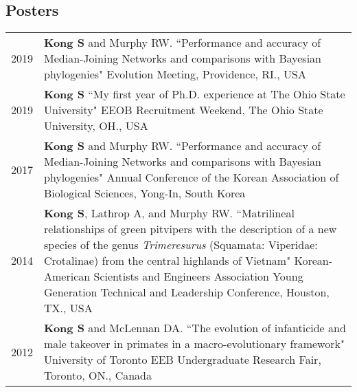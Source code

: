 \documentclass[11pt]{article}
\begin{document}
\subsection*{Posters}
\begin{longtable}{p{}  p{}}
2019 & \textbf{Kong S} and Murphy RW. ``Performance and accuracy of Median-Joining Networks and comparisons with Bayesian phylogenies" Evolution Meeting, Providence, RI., USA \vspace{5pt} \\ 
2019 &  \textbf{Kong S} ``My first year of Ph.D. experience at The Ohio State University" EEOB Recruitment Weekend,  The Ohio State University, OH., USA\vspace{5pt} \\ 
2017 & \textbf{Kong S} and Murphy RW. ``Performance and accuracy of Median-Joining Networks and comparisons with Bayesian phylogenies"  Annual Conference of the Korean Association of Biological Sciences, Yong-In, South Korea\vspace{5pt} \\ 
2014 & \textbf{Kong S}, Lathrop A, and Murphy RW. ``Matrilineal relationships of green pitvipers with the description of a new species of the genus \textit{Trimeresurus} (Squamata: Viperidae: Crotalinae) from the central highlands of Vietnam" Korean-American Scientists and Engineers Association Young Generation Technical and Leadership Conference, Houston, TX., USA\vspace{5pt} \\ 
2012 & \textbf{Kong S} and McLennan DA. ``The evolution of infanticide and male takeover in primates in a macro-evolutionary framework" University of Toronto EEB Undergraduate Research Fair, Toronto, ON., Canada\vspace{5pt}\\
\end{longtable}
\end{document}
